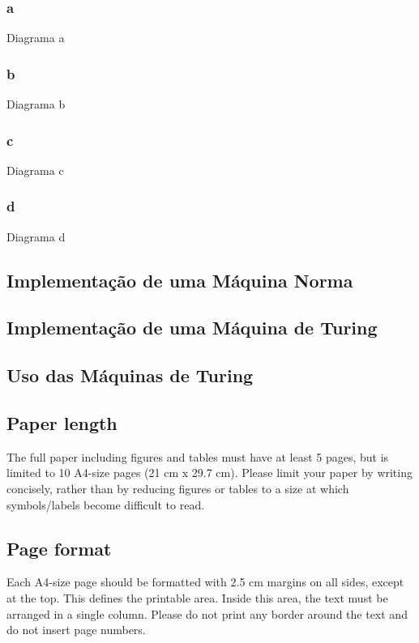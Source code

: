 \documentclass[12pt,fleqn]{article}
\begin{document}
\subsubsection{a}
Diagrama a

\subsubsection{b}
Diagrama b

\subsubsection{c}
Diagrama c

\subsubsection{d}
Diagrama d

\subsection{Implementação de uma Máquina Norma}

\subsection{Implementação de uma Máquina de Turing}

\subsection{Uso das Máquinas de Turing}


\subsection{Paper length} The full paper including figures and tables must have
at least 5 pages, but is limited to 10 A4-size pages (21 cm x 29.7 cm). Please
limit your paper by writing concisely, rather than by reducing figures or tables
to a size at which symbols/labels become difficult to read.

\subsection{Page format}
Each A4-size page should be formatted with 2.5 cm margins on all sides, except
at the top. This defines the printable area. Inside this area, the text must be
arranged in a single column. Please do not print any border around the text and
do not insert page numbers.
\end{document}
